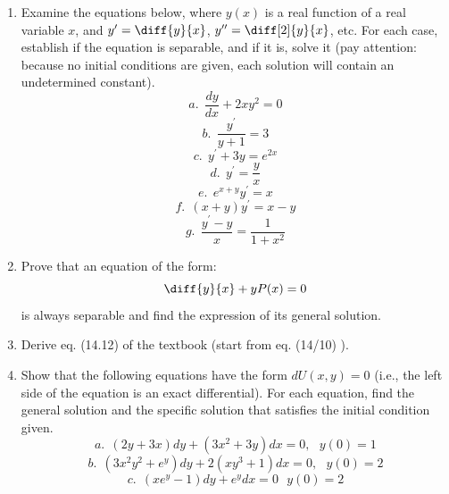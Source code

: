 \documentclass[fleqn]{article}
\begin{document}
  \begin{enumerate}
    \item  Examine the equations below, where $y(x)$ is a real function of a real variable $x$, and $y^\prime=\diff{y}{x}$,  $y^{\prime\prime}=\diff[2]{y}{x}$, etc. For each case, establish if the equation is separable, and if it is, solve it (pay attention: because no initial conditions are given, each solution will contain an undetermined constant). 
    \begin{equation*}
      a. ~~ \dfrac{dy}{dx}+2xy^2=0
    \end{equation*}
    \begin{equation*}
      b. ~~ \dfrac{y^{\prime}}{y+1}=3
    \end{equation*}
    \begin{equation*}
      c. ~~ y^{\prime}+3y=e^{2x}
    \end{equation*}
    \begin{equation*}
      d. ~~ y^{\prime}=\dfrac{y}{x}
    \end{equation*}
    \begin{equation*}
      e. ~~ e^{x+y}y^{\prime}=x
    \end{equation*}
    \begin{equation*}
      f. ~~ (x+y)y^{\prime}=x-y
    \end{equation*}
    \begin{equation*}
      g. ~~ \dfrac{y^{\prime}-y}{x}=\dfrac{1}{1+x^2}
    \end{equation*}

    \item Prove that an equation of the form:
    $$
    \diff{y}{x} + y P(x) = 0
    $$
    is always separable and find the expression of its general solution.  

    \item Derive eq. (14.12) of the textbook (start from eq. (14/10) ). 
    

    \item Show that the following equations have the form $dU(x,y)=0$ (i.e., the left side of the equation is an exact differential). For each equation, find the general solution and the specific solution that satisfies the initial condition given.
    \begin{equation*}
      a. ~~ (2y+3x)dy+(3x^2+3y)dx=0, ~~~ y(0)=1
    \end{equation*}
    \begin{equation*}
      b. ~~ (3x^2y^2+e^y)dy+2(xy^3+1)dx=0, ~~~ y(0)=2
    \end{equation*}
    \begin{equation*}
      c. ~~ (xe^y-1)dy+e^ydx=0 ~~~ y(0)=2
    \end{equation*}
    

\end{enumerate}
\end{document}
